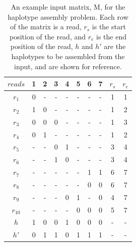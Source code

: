 \documentclass[10pt,twocolumn]{article}
\begin{document}
\begin{table}[h!]
\centering
\caption{An example input matrix, M, for the haplotype assembly problem. Each row of the matrix is a read, 
        $r_s$ is the start position of the read, and $r_e$ is the end position of the read, $h$ and $h'$ are
        the haplotypes to be assembled from the input, and are shown for reference.}
        \vspace{0.2cm}
\label{tab:exinp}   
\begin{tabular}{c c c c c c c c c c}
    \hline 
    $reads$     & 1     & 2     & 3     & 4     & 5     & 6     & 7     & $r_s$     & $r_e$         \\
    \hline
    $r_1$       & 0     & -     & -     & -     & -     & -     & -     & 1         & 1             \\
    $r_2$       & 1     & 0     & -     & -     & -     & -     & -     & 1         & 2             \\
    $r_3$       & 0     & 0     & 0     & -     & -     & -     & -     & 1         & 3             \\
    $r_4$       & 0     & 1     & -     & -     & -     & -     & -     & 1         & 2             \\
    $r_5$       & -     & -     & 0     & 1     & -     & -     & -     & 3         & 4             \\
    $r_6$       & -     & -     & 1     & 0     & -     & -     & -     & 3         & 4             \\
    $r_7$       & -     & -     & -     & -     & -     & 1     & 1     & 6         & 7             \\
    $r_8$       & -     & -     & -     & -     & -     & 0     & 0     & 6         & 7             \\
    $r_9$       & -     & -     & -     & 0     & 1     & -     & 0     & 4         & 7             \\
    $r_{10}$      & -     & -     & -     & -     & 0     & 0     & 0     & 5         & 7             \\
    \hline                                                                                          
    \hline                                                                                          
    $h$         & 1     & 0     & 0     & 1     & 0     & 0     & 0     & -         & -               \\
    $h'$        & 0     & 1     & 1     & 0     & 1     & 1     & 1     & -         & -               \\
    \hline
\end{tabular}
\end{table}
\end{document}
